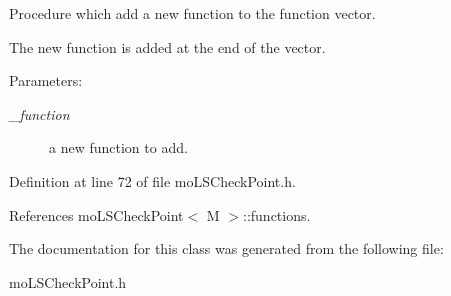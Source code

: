 Procedure which add a new function to the function vector. 

The new function is added at the end of the vector. \begin{Desc}
\item[Parameters:]
\begin{description}
\item[{\em \_\-function}]a new function to add. \end{description}
\end{Desc}


Definition at line 72 of file mo\-LSCheck\-Point.h.

References mo\-LSCheck\-Point$<$ M $>$::functions.

The documentation for this class was generated from the following file:\begin{CompactItemize}
\item 
mo\-LSCheck\-Point.h\end{CompactItemize}
